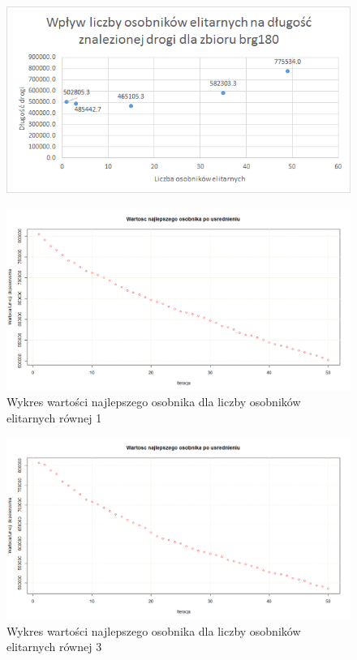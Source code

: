 \begin{figure}[H]
\centering

\includegraphics[scale=0.9]{IO_obrazy/excel_brg180_elit}
\end{figure}

\begin{figure}[H]
\centering

\includegraphics[scale=0.3]{IO_obrazy/brg180_elit_1}
\caption{Wykres wartości najlepszego osobnika dla liczby osobników elitarnych równej 1}
\end{figure}

\begin{figure}[H]
\centering

\includegraphics[scale=0.3]{IO_obrazy/brg180_elit_3}
\caption{Wykres wartości najlepszego osobnika dla liczby osobników elitarnych równej 3}
\end{figure}


